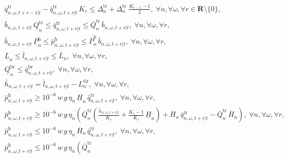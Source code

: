 \documentclass[10pt,a4paper]{amsart}
\begin{document}
\begin{subequations}
\begin{align}
\label{eq:TSA_cen_sto_ramping1}\\
& \bar{q}^{\mathrm{tr}}_{n, \omega, t+r-1|t} - \bar{q}^{\mathrm{tr}}_{n, \omega, t+r|t} \, K_{r} \leq
\Delta^{\mathrm{tr}}_{n} + \Delta^{\mathrm{tr}}_{n} \; \frac{K_{r - 1} - 1}{2}, \; \forall n, \forall \omega, \forall r \in \boldsymbol{R} \setminus \{0\}, \label{eq:TSA_cen_sto_ramping2}\\
& \bar{b}_{n, \omega, t+r|t} \, \underline{Q}^{\mathrm{tr}}_{n} \leq \bar{q}^{\mathrm{tr}}_{n, \omega, t+r | t} \leq \overline{Q}^{\mathrm{tr}}_{n} \, \bar{b}_{n, \omega, t+r|t}, \; \forall n, \forall \omega, \forall r, 
\label{eq:TSA_cen_sto_tr_lim}\\
& \bar{b}_{n, \omega, t+r|t} \, \underline{P}^{\mathrm{h}}_{n} \leq \bar{p}^{\mathrm{h}}_{n, \omega, t+r | t} \leq \overline{P}^{\mathrm{h}}_{n} \, \bar{b}_{n, \omega, t+r|t}, \; \forall n, \forall \omega, \forall r, 
\label{eq:TSA_cen_sto_ph_lim}\\
& \underline{L}_{n} \leq \bar{l}_{n, \omega, t+r | t} \leq \overline{L}_{n}, \; \forall n, \forall \omega, \forall r,
\label{eq:TSA_cen_sto_wl_lim}\\
& \underline{Q}^{\mathrm{br}}_{n} \leq \bar{q}^{\mathrm{br}}_{n, \omega, t+r | t}, \; \forall n, \forall \omega, \forall r,
\label{eq:TSA_cen_sto_br_lim}\\
& \bar{h}_{n, \omega, t+r|t} = \bar{l}_{n, \omega, t+r|t} - L^{\mathrm{tlr}}_{n},
\; \forall n, \forall \omega, \forall r,
\label{eq:TSA_cen_sto_head}\\
& \bar{p}^{\mathrm{h}}_{n, \omega, t+r|t} \geq 10^{-6} \, w \, g \, \eta_n \, \underline{H}_{n} \, \bar{q}^{\mathrm{tr}}_{n, \omega, t+r|t}, \; \forall n, \forall \omega, \forall r, 
\label{eq:TSA_cen_sto_McCormick1}\\
& \bar{p}^{\mathrm{h}}_{n, \omega, t+r|t} \geq 10^{-6} \, w \, g \, \eta_n \left(
\overline{Q}^{\mathrm{tr}}_{n}
\left(\frac{\bar{h}_{n, \omega, t+r|t}}{K_r} + \frac{K_r - 1}{K_r} \, \underline{H}_n \right)
+ \overline{H}_{n} \, \bar{q}^{\mathrm{tr}}_{n, \omega, t+r|t} - \overline{Q}^{\mathrm{tr}}_{n}  \, \overline{H}_{n}\right), \; \forall n, \forall \omega, \forall r, 
\label{eq:TSA_cen_sto_McCormick2}\\
& \bar{p}^{\mathrm{h}}_{n, \omega, t+r|t} \leq 10^{-6} \, w \, g \, \eta_n \, \overline{H}_{n} \, \bar{q}^{\mathrm{tr}}_{n, \omega, t+r|t}, \; \forall n, \forall \omega, \forall r,
\label{eq:TSA_cen_sto_McCormick3}\\
& \bar{p}^{\mathrm{h}}_{n, \omega, t+r|t} \leq 10^{-6} \, w \, g \, \eta_n \left(\overline{Q}^{\mathrm{tr}}_{n} 

\end{align}
\end{subequations}
\end{document}
